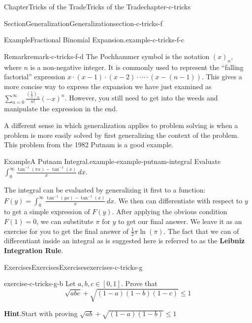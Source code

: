 \documentclass[oneside,10pt,]{book}
\newcommand{\blocktitlefont}{\relax}
\newcommand{\terminology}[1]{\textbf{#1}}
\numberwithin{equation}{section}
\begin{document}
\begin{chapterptx}{Chapter}{Tricks of the Trade}{}{Tricks of the Trade}{}{}{chapter-c-tricks}
\begin{sectionptx}{Section}{Generalization}{}{Generalization}{}{}{section-c-tricks-f}
\begin{example}{Example}{Fractional Binomial Expansion.}{example-c-tricks-f-c}
\begin{equation*}
\end{equation*}
%
\end{example}
\begin{remark}{Remark}{}{remark-c-tricks-f-d}%
 The Pochhammer symbol is the notation  \((x)_n\), where \(n\) is a non-negative integer. It is commonly used to represent the ``falling factorial'' expression  \(x\cdot(x-1)\cdot(x-2)\cdot \cdots \cdot (x-(n-1))\).  This gives a more concise way to express the expansion we have just examined as \(\sum_{n=0}^{\infty} \frac{(\frac{1}{2})_n}{n!} (-x)^n\).  However, you still need to get into the weeds and manipulate the expression in the end.%
\end{remark}
A different sense in which generalization applies to problem solving is when a problem is more easily solved by first generalizing the context of the problem.  This problem from the 1982 Putnam is a good example.%
\begin{example}{Example}{A Putnam Integral.}{example-example-putnam-integral}%
%
Evaluate \(\int_0^{\infty} \frac{\tan^{-1}(\pi  x)-\tan^{-1}(x)}{x} \, dx\).%
\par
The integral can be evaluated by generalizing it first to a function: \(F(y)=\int_0^{\infty} \frac{\tan ^{-1}(y x)-\tan ^{-1}(x)}{x} \, dx\). We then can differentiate with respect to \(y\) to get a simple expression of \(F(y)\).  After applying the obvious condition \(F(1)=0\), we can substitute \(\pi\) for \(y\) to get our final answer.  We leave it as an exercise for you to get the final answer of \(\frac{1}{2} \pi  \ln(\pi )\).   The fact that we can of differentiant inside an integral as is suggested here is referred to as the \terminology{Leibniz Integration Rule}.%
\end{example}
\end{sectionptx}
%
%
\typeout{************************************************}
\typeout{************************************************}
%
\begin{exercises-section}{Exercises}{Exercises}{}{Exercises}{}{}{exercises-c-tricks-g}
\begin{divisionexercise}{1}{}{}{exercise-c-tricks-g-b}%
Let \(a, b, c \in [0, 1]\). Prove that%
\begin{equation*}
\sqrt{a b c}+ \sqrt{(1-a)(1-b)(1-c)} \leq 1
\end{equation*}
%
\par\smallskip%
\noindent\textbf{\blocktitlefont Hint}.\hypertarget{hint-c-tricks-g-b-b}{}\quad{}Start with proving  \(\sqrt{a b}+ \sqrt{(1-a)(1-b)} \leq 1\)%

\end{divisionexercise}
\end{exercises-section}
\end{chapterptx}
\end{document}
